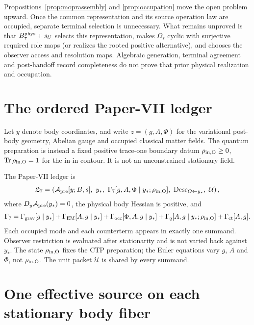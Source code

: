 Propositions~\ref{prop:moprassembly} and \ref{prop:occupation} move the open
problem upward.  Once the common representation and its source operation law
are occupied, separate terminal selection is unnecessary.  What remains
unproved is that $B_\tau^{\rm phys}+s_U$ selects this representation, makes
$\Omega_s$ cyclic with surjective required role maps (or realizes the rooted
positive alternative), and chooses
the observer access and resolution maps.  Algebraic generation, terminal
agreement and post-handoff record completeness do not prove that prior
physical realization and occupation.

\section{The ordered Paper-VII ledger}

Let $y$ denote body coordinates, and write $z=(g,A,\Phi)$ for the variational
post-body geometry, Abelian gauge and occupied classical matter fields.  The
quantum preparation is instead a fixed positive trace-one boundary datum
$\rho_{\rm in,O}\geq0$, $\operatorname{Tr}\rho_{\rm in,O}=1$ for the in-in
contour.  It is not an unconstrained stationary field.

\begin{definition}
The Paper-VII ledger is
\begin{equation}
\mathfrak L_7=\left(
\mathcal A_{\rm pre}[y;B,s],\ y_*,\
\Gamma_7[g,A,\Phi\mid y_*;\rho_{\rm in,O}],\
\operatorname{Desc}_{O\leftarrow y_*},\ \mathcal U
\right),
\end{equation}
where $D_y\mathcal A_{\rm pre}(y_*)=0$, the physical body Hessian is positive,
and
\begin{equation}
\Gamma_7=\Gamma_{\rm grav}[g\mid y_*]
+\Gamma_{\rm EM}[A,g\mid y_*]
+\Gamma_{\rm occ}[\Phi,A,g\mid y_*]
+\Gamma_q[A,g\mid y_*;\rho_{\rm in,O}]+\Gamma_{\rm ct}[A,g].
\label{eq:jointfunctional}
\end{equation}
Each occupied mode and each counterterm appears in exactly one summand.
Observer restriction is evaluated after stationarity and is not varied back
against $y_*$.  The state $\rho_{\rm in,O}$ fixes the CTP preparation; the
Euler equations vary $g$, $A$ and $\Phi$, not $\rho_{\rm in,O}$.  The unit
packet $\mathcal U$ is shared by every summand.
\end{definition}

\section{One effective source on each stationary body fiber}

